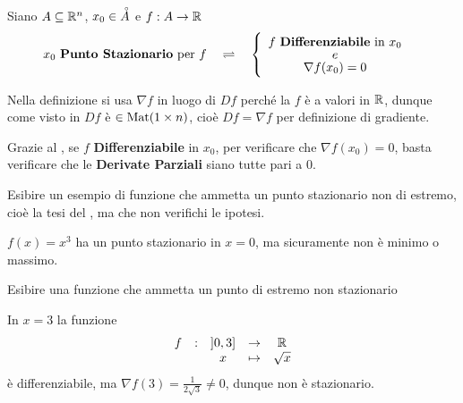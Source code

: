 \begin{definition}
	Siano $A \subseteq \mathbb{R}^n$, $x_0 \in \accentset{\circ}{A}$ e $f: A \to \mathbb{R}$
	\[
		x_0 \text{ \textbf{Punto Stazionario} per } f
		\quad \rightleftharpoons \quad
		\begin{cases}
			\begin{array}{c}
				f \text{ \textbf{Differenziabile} in } x_0\\[-1ex]
				e\\[-1ex]
				\nabla f(x_0) = 0
			\end{array}
		\end{cases}
	\]
	\begin{note}
		Nella definizione si usa $\nabla f$ in luogo di $Df$ perché la $f$ è a valori in $\mathbb{R}$, dunque come visto in  $Df$ è $\in \operatorname{Mat}(1 \times n)$, cioè $Df = \nabla f$ per definizione di gradiente.
	\end{note}
\end{definition}
\begin{observation}
	Grazie al , se $f$ \textbf{Differenziabile} in $x_0$, per verificare che $\nabla f(x_0) = 0$, basta verificare che le \textbf{Derivate Parziali} siano tutte pari a $0$.
\end{observation}
\begin{exercise}
	Esibire un esempio di funzione che ammetta un punto stazionario non di estremo, cioè la tesi del , ma che non verifichi le ipotesi.
	\begin{solution}
		$f(x) = x^3$ ha un punto stazionario in $x=0$, ma sicuramente non è minimo o massimo.
	\end{solution}
\end{exercise}
\begin{exercise}
	Esibire una funzione che ammetta un punto di estremo non stazionario
	\begin{solution}
		In $x = 3$ la funzione
		\[\begin{array}{ccccc} {f} & : & {\left]0,3\right]} & \to & {\mathbb{R}} \\ & & {x} & \mapsto & {\sqrt{x}} \\ \end{array}\]
		è differenziabile, ma $\nabla f(3) = \frac{1}{2\sqrt{3}} \neq 0$, dunque non è stazionario.
	\end{solution}
\end{exercise}

